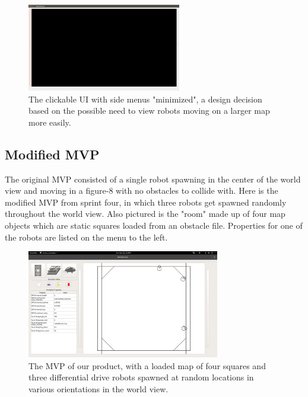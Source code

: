 \begin{figure}[H]
	\begin{center}
		\includegraphics[width=0.60\textwidth]{./Images/Sprint1_clickableUI_NoMenus}
	\end{center}
	\caption{The clickable UI with side menus "minimized", a design decision based on the possible need to view robots moving on a larger map more easily. \label{clickableuinomenus}}
\end{figure}

\subsection{Modified MVP}

The original MVP consisted of a single robot spawning in the center of the world view and moving in a figure-8 with no obstacles to collide with. Here is the modified MVP from sprint four, in which three robots get spawned randomly throughout the world view. Also pictured is the "room" made up of four map objects which are static squares loaded from an obstacle file. Properties for one of the robots are listed on the menu to the left.

\begin{figure}[!htb]
	\begin{center}
		\includegraphics[width=0.75\textwidth]{./Images/Sprint3_hasBox_originalUI}
	\end{center}
	\caption{The MVP of our product, with a loaded map of four squares and three differential drive robots spawned at random locations in various orientations in the world view. \label{mvp1}}
\end{figure}


